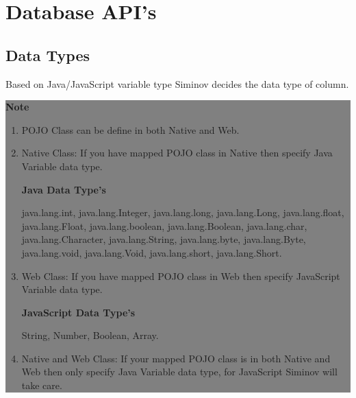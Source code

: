 \newpage
\chapter {\Large{Database API's}}


\section{Data Types}
Based on Java/JavaScript variable type Siminov decides the data type of column.


					\begin{center}
						\colorbox{grey}{
						\parbox[t]{.8\linewidth}{
							\fontsize{11pt}{11pt}\selectfont %
							\vspace*{0.1cm} %
		
							\hfill \textbf{Note} \\
		
												\begin{enumerate}
		
					\item \small POJO Class can be define in both Native and Web.

					\item \small Native Class: If you have mapped POJO class in Native then specify Java Variable data type.

					\textbf{Java Data Type's}
						\par
						java.lang.int, java.lang.Integer, java.lang.long, java.lang.Long, java.lang.float, java.lang.Float, java.lang.boolean, java.lang.Boolean, java.lang.char, java.lang.Character, java.lang.String, java.lang.byte, java.lang.Byte, java.lang.void, java.lang.Void, java.lang.short, java.lang.Short.

				
					\item \small Web Class: If you have mapped POJO class in Web then specify JavaScript Variable data type.

					\textbf{JavaScript Data Type's}
						\par
						String, Number, Boolean, Array.
	

					\item \small Native and Web Class: If your mapped POJO class is in both Native and Web then only specify Java Variable data type, for JavaScript Siminov will take care.


				\end{enumerate}




							\vspace*{0.0cm} %
						}
					}

					\end{center}



